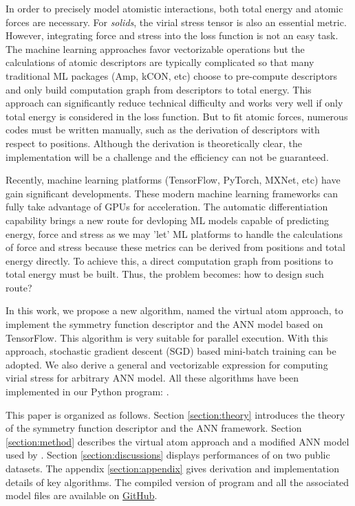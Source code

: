 \documentclass[prb,preprint]{revtex4-2}
\begin{document}
In order to precisely model atomistic interactions, both total energy and atomic 
forces are necessary. For \textit{solids}, the virial stress tensor is also an
essential metric. However, integrating force and stress into the loss function 
is not an easy task. The machine learning approaches favor vectorizable 
operations but the calculations of atomic descriptors are typically complicated 
so that many traditional ML packages (Amp, kCON, etc) choose to pre-compute 
descriptors and only build computation graph from descriptors to total energy. 
This approach can significantly reduce technical difficulty and works very well 
if only total energy is considered in the loss function. But to fit atomic 
forces, numerous codes must be written manually, such as the derivation of 
descriptors with respect to positions. Although the derivation is theoretically
clear, the implementation will be a challenge and the efficiency can not be 
guaranteed.

Recently, machine learning platforms (TensorFlow\cite{tensorflow}, 
PyTorch\cite{pytorch}, MXNet\cite{MXNet}, etc) have gain significant 
developments. These modern machine learning frameworks can fully take advantage 
of GPUs for acceleration. The automatic differentiation capability brings a new 
route for devloping ML models capable of predicting energy, force and stress as 
we may 'let' ML platforms to handle the calculations of force and stress because 
these metrics can be derived from positions and total energy directly. To 
achieve this, a direct computation graph from positions to total energy must be
built. Thus, the problem becomes: how to design such route?

In this work, we propose a new algorithm, named the virtual atom approach, to 
implement the symmetry function descriptor and the ANN model based on 
TensorFlow. This algorithm is very suitable for parallel execution. With this 
approach, stochastic gradient descent (SGD) based mini-batch training can be 
adopted. We also derive a general and vectorizable expression for computing 
virial stress for arbitrary ANN model. All these algorithms have been 
implemented in our Python program: \tensoralloy{}. 

This paper is organized as follows. Section \ref{section:theory} introduces the 
theory of the symmetry function descriptor and the ANN framework. Section 
\ref{section:method} describes the virtual atom approach and a modified ANN 
model used by \tensoralloy{}. Section \ref{section:discussions} displays 
performances of \tensoralloy{} on two public datasets. The appendix 
\ref{section:appendix} gives derivation and implementation details of key 
algorithms. The compiled version of \tensoralloy{} program and all the 
associated model files are available on 
\href{https://github.com/Bismarrck/tensoralloy-release}{GitHub}.
\end{document}
